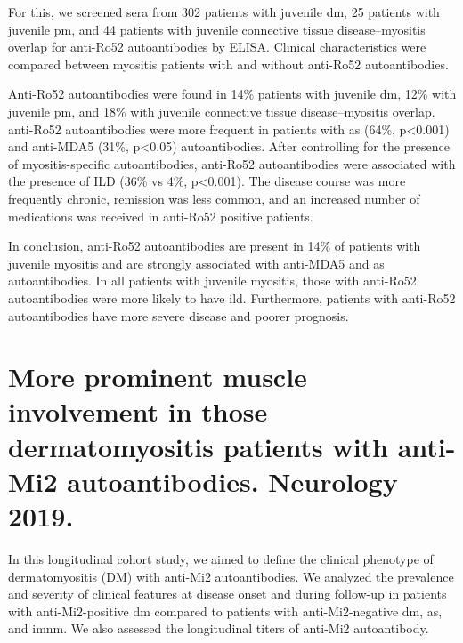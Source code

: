 For this, we screened sera from 302 patients with juvenile \gls{dm}, 25 patients with juvenile \gls{pm}, and 44 patients with
juvenile connective tissue disease–myositis overlap for anti-Ro52 autoantibodies by ELISA. Clinical characteristics were compared between myositis patients with and without anti-Ro52 autoantibodies.

Anti-Ro52 autoantibodies were found in 14\% patients with juvenile \gls{dm}, 12\% with juvenile \gls{pm}, and 18\% with juvenile connective tissue disease–myositis overlap. anti-Ro52 autoantibodies were more frequent in patients with \gls{as} (64\%, p<0.001) and anti-MDA5 (31\%, p<0.05) autoantibodies. After controlling for the presence of myositis-specific autoantibodies, anti-Ro52 autoantibodies were associated with the presence of ILD (36\% vs 4\%, p<0.001). The disease course was more frequently chronic, remission was less common, and an increased number of medications was received in anti-Ro52 positive patients.

In conclusion, anti-Ro52 autoantibodies are present in 14\% of patients with juvenile myositis and are strongly associated with anti-MDA5 and \gls{as} autoantibodies. In all patients with juvenile myositis, those with anti-Ro52 autoantibodies were more likely to have \gls{ild}. Furthermore, patients with anti-Ro52 autoantibodies have more severe disease and poorer prognosis.


{\cleardoublepage}

\section{More prominent muscle involvement in those dermatomyositis patients with anti-Mi2 autoantibodies. Neurology 2019.}
\label{sec:mi2_clinical}

In this longitudinal cohort study, we aimed to define the clinical phenotype of dermatomyositis (DM) with anti-Mi2 autoantibodies. We analyzed the prevalence and severity of clinical features at disease onset and during follow-up in patients with anti-Mi2-positive \gls{dm} compared to patients with anti-Mi2-negative \gls{dm}, \gls{as}, and \gls{imnm}. We also assessed the longitudinal titers of anti-Mi2 autoantibody.

